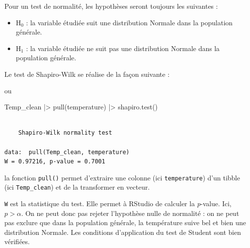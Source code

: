 \documentclass[
  french,
  a4paper,
  DIV=11,
  numbers=noendperiod,
  oneside]{scrreprt}
\newenvironment{Shaded}{}{}
\newcommand{\FunctionTok}[1]{\textcolor[rgb]{0.44,0.26,0.76}{#1}}
\newcommand{\NormalTok}[1]{\textcolor[rgb]{0.14,0.16,0.18}{#1}}
\newcommand{\SpecialCharTok}[1]{\textcolor[rgb]{0.00,0.36,0.77}{#1}}
\providecommand{\tightlist}{%
  \setlength{\itemsep}{0pt}\setlength{\parskip}{0pt}}
\begin{document}
Pour un test de normalité, les hypothèses seront toujours les suivantes
:

\begin{itemize}
\tightlist
\item
  H\(_0\) : la variable étudiée suit une distribution Normale dans la
  population générale.
\item
  H\(_1\) : la variable étudiée ne suit pas une distribution Normale
  dans la population générale.
\end{itemize}

Le test de Shapiro-Wilk se réalise de la façon suivante :

\begin{Shaded}
\end{Shaded}

ou

\begin{Shaded}
\begin{Highlighting}[]
\NormalTok{Temp\_clean }\SpecialCharTok{|\textgreater{}}
  \FunctionTok{pull}\NormalTok{(temperature) }\SpecialCharTok{|\textgreater{}}
  \FunctionTok{shapiro.test}\NormalTok{()}
\end{Highlighting}
\end{Shaded}

\begin{verbatim}

    Shapiro-Wilk normality test

data:  pull(Temp_clean, temperature)
W = 0.97216, p-value = 0.7001
\end{verbatim}

la fonction \texttt{pull()} permet d'extraire une colonne (ici
\texttt{temperature}) d'un tibble (ici \texttt{Temp\_clean}) et de la
transformer en vecteur.

\texttt{W} est la statistique du test. Elle permet à RStudio de calculer
la \emph{p}-value. Ici, \(p > \alpha\). On ne peut donc pas rejeter
l'hypothèse nulle de normalité : on ne peut pas exclure que dans la
population générale, la température suive bel et bien une distribution
Normale. Les conditions d'application du test de Student sont bien
vérifiées.
\end{document}
